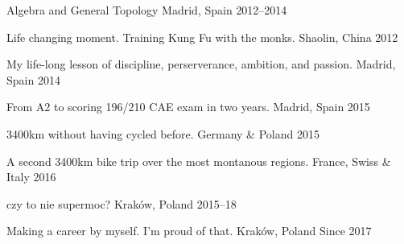 
\begin{cvhonors}

    {Algebra and General Topology} %
    {Madrid, Spain} %
    {2012--2014} %

    {Life changing moment. Training Kung Fu with the monks.} %
    {Shaolin, China} %
    {2012} %

    {My life-long lesson of discipline, perserverance, ambition, and passion.} %
    {Madrid, Spain} %
    {2014} %

    {From A2 to scoring 196/210 CAE exam in two years.} %
    {Madrid, Spain} %
    {2015} %

    {3400km without having cycled before.} %
    {Germany \& Poland} %
    {2015} %

    {A second 3400km bike trip over the most montanous regions.} %
    {France, Swiss \& Italy} %
    {2016} %

    {czy to nie supermoc?} %
    {Kraków, Poland} %
    {2015--18} %

    {Making a career by myself. I'm proud of that.} %
    {Kraków, Poland} %
    {Since 2017} %

\end{cvhonors}
